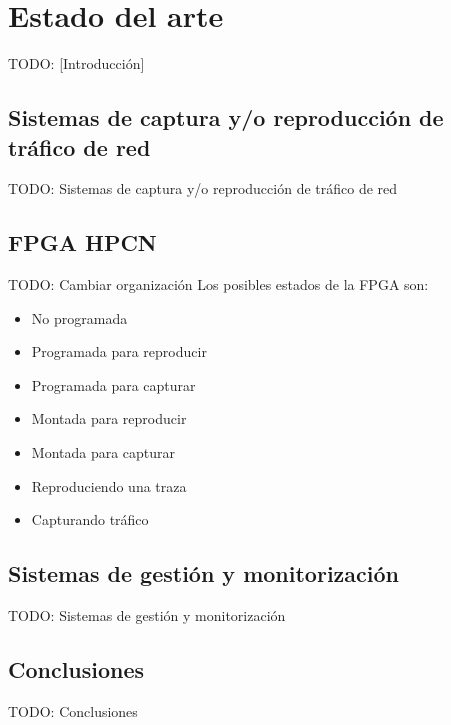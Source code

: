 \chapter{Estado del arte\label{cap:estado_del_arte}}

TODO: [Introducción]


\section{Sistemas de captura y/o reproducción de tráfico de red\label{sec:eda:sistemas_captura_reproducccion}}

TODO: Sistemas de captura y/o reproducción de tráfico de red

\section{FPGA HPCN\label{ssec:eda:fpga}}
TODO: Cambiar organización
Los posibles estados de la \gls{FPGA} son:
\begin{itemize}\label{fpga:estados}
  \item No programada
  \item Programada para reproducir
  \item Programada para capturar
  \item Montada para reproducir
  \item Montada para capturar
  \item Reproduciendo una \gls{traza}
  \item Capturando tráfico
\end{itemize}

\section{Sistemas de gestión y monitorización\label{sec:eda:sistemas_gestion_monitorizacion}}

TODO: Sistemas de gestión y monitorización


\section{Conclusiones\label{sec:eda:conclusiones}}

TODO: Conclusiones